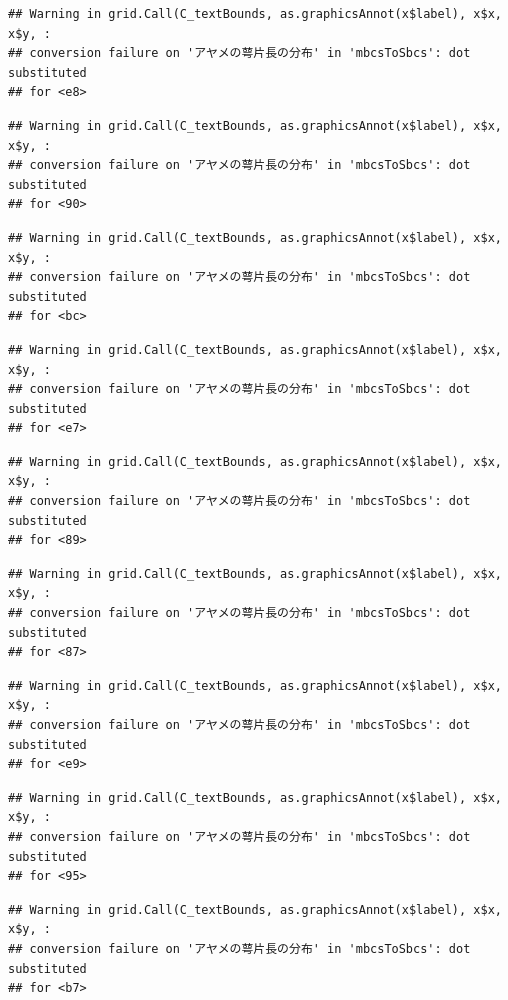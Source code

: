 \documentclass[
]{book}
\begin{document}
\begin{verbatim}
## Warning in grid.Call(C_textBounds, as.graphicsAnnot(x$label), x$x, x$y, :
## conversion failure on 'アヤメの萼片長の分布' in 'mbcsToSbcs': dot substituted
## for <e8>
\end{verbatim}

\begin{verbatim}
## Warning in grid.Call(C_textBounds, as.graphicsAnnot(x$label), x$x, x$y, :
## conversion failure on 'アヤメの萼片長の分布' in 'mbcsToSbcs': dot substituted
## for <90>
\end{verbatim}

\begin{verbatim}
## Warning in grid.Call(C_textBounds, as.graphicsAnnot(x$label), x$x, x$y, :
## conversion failure on 'アヤメの萼片長の分布' in 'mbcsToSbcs': dot substituted
## for <bc>
\end{verbatim}

\begin{verbatim}
## Warning in grid.Call(C_textBounds, as.graphicsAnnot(x$label), x$x, x$y, :
## conversion failure on 'アヤメの萼片長の分布' in 'mbcsToSbcs': dot substituted
## for <e7>
\end{verbatim}

\begin{verbatim}
## Warning in grid.Call(C_textBounds, as.graphicsAnnot(x$label), x$x, x$y, :
## conversion failure on 'アヤメの萼片長の分布' in 'mbcsToSbcs': dot substituted
## for <89>
\end{verbatim}

\begin{verbatim}
## Warning in grid.Call(C_textBounds, as.graphicsAnnot(x$label), x$x, x$y, :
## conversion failure on 'アヤメの萼片長の分布' in 'mbcsToSbcs': dot substituted
## for <87>
\end{verbatim}

\begin{verbatim}
## Warning in grid.Call(C_textBounds, as.graphicsAnnot(x$label), x$x, x$y, :
## conversion failure on 'アヤメの萼片長の分布' in 'mbcsToSbcs': dot substituted
## for <e9>
\end{verbatim}

\begin{verbatim}
## Warning in grid.Call(C_textBounds, as.graphicsAnnot(x$label), x$x, x$y, :
## conversion failure on 'アヤメの萼片長の分布' in 'mbcsToSbcs': dot substituted
## for <95>
\end{verbatim}

\begin{verbatim}
## Warning in grid.Call(C_textBounds, as.graphicsAnnot(x$label), x$x, x$y, :
## conversion failure on 'アヤメの萼片長の分布' in 'mbcsToSbcs': dot substituted
## for <b7>
\end{verbatim}
\end{document}
